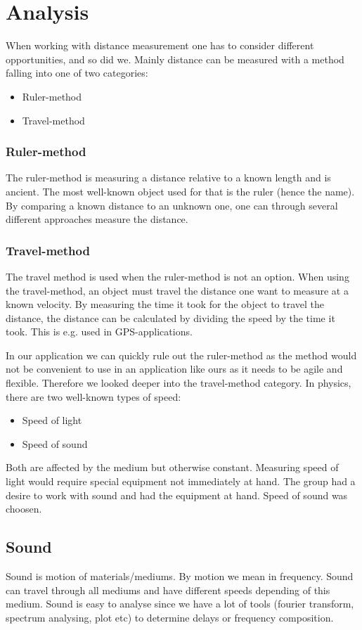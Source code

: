 \chapter{Analysis}
When working with distance measurement one has to consider different opportunities, and so did we.
Mainly distance can be measured with a method falling into one of two categories:
\begin{itemize}
\item Ruler-method
\item Travel-method
\end{itemize}

\subsection{Ruler-method}
The ruler-method is measuring a distance relative to a known length and is ancient. The most well-known object used for that is the ruler (hence the name). By comparing a known distance to an unknown one, one can through several different approaches measure the distance.

\subsection{Travel-method}
The travel method is used when the ruler-method is not an option. When using the travel-method, an object must travel the distance one want to measure at a known velocity. By measuring the time it took for the object to travel the distance, the distance can be calculated by dividing the speed by the time it took. This is e.g. used in GPS-applications.

In our application we can quickly rule out the ruler-method as the method would not be convenient to use in an application like ours as it needs to be agile and flexible. Therefore we looked deeper into the travel-method category.
In physics, there are two well-known types of speed: 
\begin{itemize}
\item Speed of light
\item Speed of sound
\end{itemize}
Both are affected by the medium but otherwise constant. Measuring speed of light would require special equipment not immediately at hand. The group had a desire to work with sound and had the equipment at hand. Speed of sound was choosen.

\section{Sound}
Sound is motion of materials/mediums. By motion we mean in frequency. Sound can travel through all mediums and have different speeds depending of this medium. Sound is easy to analyse since we have a lot of tools (fourier transform, spectrum analysing, plot etc) to determine delays or frequency composition.

